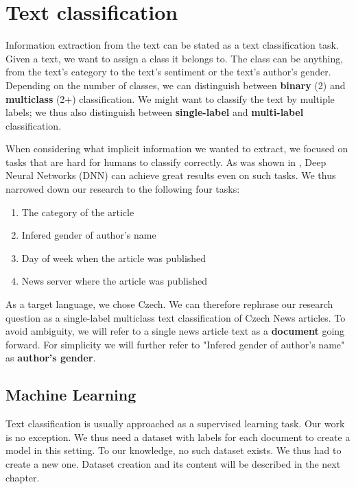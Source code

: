 \chapter{Text classification}
Information extraction from the text can be stated as a text classification task.
Given a text, we want to assign a class it belongs to.
The class can be anything, from the text's category to the text's sentiment or the text's author's gender.
Depending on the number of classes, we can distinguish between \textbf{binary} (2) and \textbf{multiclass} (2+) classification.
We might want to classify the text by multiple labels; we thus also distinguish between \textbf{single-label}
and \textbf{multi-label} classification.


When considering what implicit information we wanted to extract, we focused on tasks
that are hard for humans to classify correctly. As was shown in \cite{wangDeepNeuralNetworks2017},
Deep Neural Networks (DNN) can achieve great results even on such tasks.
We thus narrowed down our research to the following four tasks:
\begin{enumerate}
    \item The category of the article
    \item Infered gender of author's name
    \item Day of week when the article was published
    \item News server where the article was published
\end{enumerate}
As a target language, we chose Czech.
We can therefore rephrase our research question as a single-label multiclass text classification of Czech News articles.
To avoid ambiguity, we will refer to a single news article text as a \textbf{document} going forward.
For simplicity we will further refer to "Infered gender of author's name" as \textbf{author's gender}.

\section{Machine Learning}
Text classification is usually approached as a supervised learning task. Our work is no exception.
We thus need a dataset with labels for each document to create a model in this setting.
To our knowledge, no such dataset exists. We thus had to create a new one.
Dataset creation and its content will be described in the next chapter.

